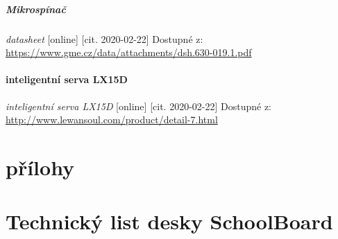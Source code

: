 \documentclass{template/socthesis}
\begin{document}
\begin{thebibliography}{1}
	\subsubsection{Mikrospínač}
	
	\textit{datasheet} [online] [cit. 2020-02-22] Dostupné z:
	\url{https://www.gme.cz/data/attachments/dsh.630-019.1.pdf}
	
	\subsection{inteligentní serva LX15D}
	
	\textit{inteligentní serva LX15D} [online] [cit. 2020-02-22] Dostupné z:
	\url{http://www.lewansoul.com/product/detail-7.html}
	
\end{thebibliography}

\part{přílohy}
\part*{Technický list desky SchoolBoard}
\end{document}
